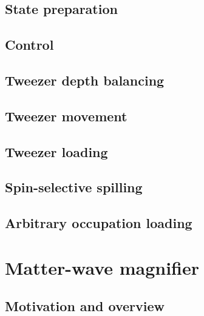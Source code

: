\documentclass[twoside]{article}
\begin{document}
\subsection{State preparation} \label{subsec:state-prepation}

\subsection{Control} \label{subsec:control}


\subsection{Tweezer depth balancing} \label{subsec:balancing}


\subsection{Tweezer movement} \label{subsec:tweezer-movement}


\subsection{Tweezer loading} \label{subsec:tweezer-loading}


\subsection{Spin-selective spilling} \label{subsec:spin-selective-spilling}


\subsection{Arbitrary occupation loading} \label{subsec:arbitrary-occupation-loading}



\newpage
\section{Matter-wave magnifier} \label{sec:mwm}

\subsection{Motivation and overview}
\end{document}
